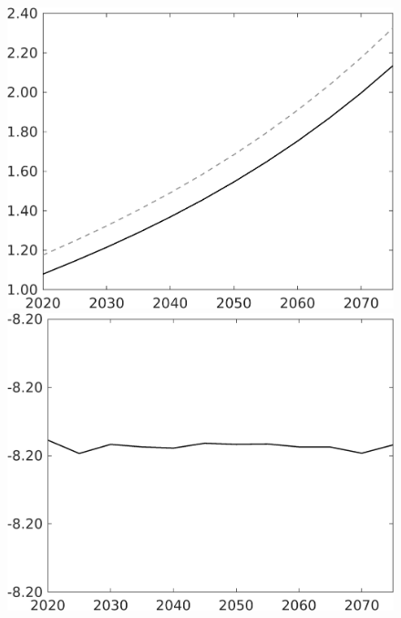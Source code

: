 \documentclass[12pt]{article}
\begin{document}
\begin{figure}[h!!]
\begin{minipage}[]{0.32\textwidth}
	\end{minipage}	
	\begin{minipage}[]{0.32\textwidth}
		\includegraphics[width=1\textwidth]{../../codding_model/own_basedOnFried/optimalPol_010922_revision/figures/all_13Sept22/CompTaul_Equlab_LFBAU_Reg0_C_spillover0_nsk1_xgr1_knspil0_sep1_countec0_GovRev0_etaa0.79_lgd0.png}
	\end{minipage}	
	\begin{minipage}[]{0.32\textwidth}
		\includegraphics[width=1\textwidth]{../../codding_model/own_basedOnFried/optimalPol_010922_revision/figures/all_13Sept22/CompTaul_Equlab_LFBAUPer_Reg0_F_spillover0_nsk1_xgr1_knspil0_sep1_countec0_GovRev0_etaa0.79.png}

\end{minipage}
\end{figure}
\end{document}
